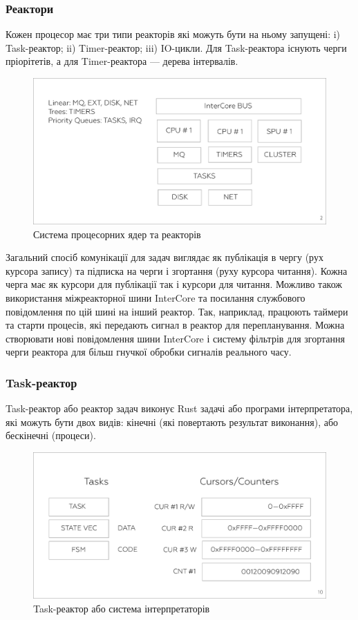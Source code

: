\subsubsection{Реактори}
Кожен процесор має три типи реакторів які можуть бути на ньому запущені:
i) Task-реактор; ii) Timer-реактор; iii) IO-цикли. Для Task-реактора
існують черги пріорітетів, а для Timer-реактора --- дерева інтервалів.
\begin{figure}[h]
  \centerline{\includegraphics[scale=0.25]{sys.eps}}
  \caption{Система процесорних ядер та реакторів}
\end{figure}
Загальний спосіб комунікації для задач виглядає як публікація
в чергу (рух курсора запису) та підписка на черги і
згортання (руху курсора читання). Кожна черга має як
курсори для публікації так і курсори для читання. Можливо також
використання міжреакторної шини InterCore та посилання
службового повідомлення по цій шині на інший реактор. Так,
наприклад, працюють таймери та старти процесів, які передають
сигнал в реактор для перепланування. Можна створювати нові повідомлення
шини InterCore і систему фільтрів для згортання черги
реактора для більш гнучкої обробки сигналів реального часу.

\subsubsection*{Task-реактор}
Task-реактор або реактор задач виконує Rust задачі або
програми інтерпретатора, які можуть бути двох видів:
кінечні (які повертають результат виконання),
або бескінечні (процеси).
\begin{figure}[h]
  \centerline{\includegraphics[scale=0.25]{task.eps}}
  \caption{Task-реактор або система інтерпретаторів}
\end{figure}

